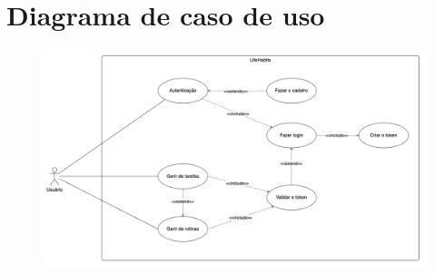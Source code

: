 \chapter{Diagrama de caso de uso}

\begin{figure}[h]
  \centering
  \includegraphics[scale=0.34]{images/diagrams/use-case.png}
\end{figure}

